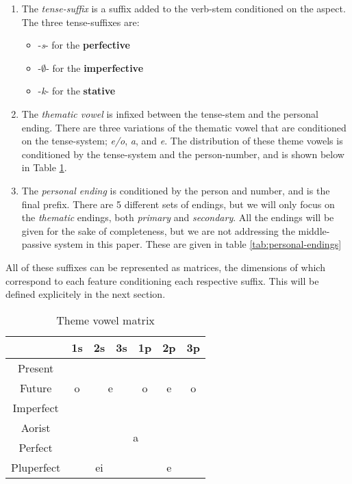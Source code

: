 \documentclass[12pt]{article}
\begin{document}
\begin{enumerate}
    \item The \textit{tense-suffix} is a suffix added to the verb-stem conditioned
        on the aspect. The three tense-suffixes are:
        \begin{itemize}
            \item -\textit{s}- for the \textbf{perfective}
            \item -$\emptyset$- for the \textbf{imperfective}
            \item -\textit{k}- for the \textbf{stative}
        \end{itemize}
    \item The \textit{thematic vowel} is infixed between the tense-stem and the
        personal ending. There are three variations of the thematic vowel 
        that are conditioned on the tense-system; \textit{e/o}, \textit{a}, and
        \textit{e}. The distribution of these theme vowels is conditioned by the
        tense-system and the person-number, and is shown below in Table \ref{tab:theme}.
    \item The \textit{personal ending} is conditioned by the person and number, and
        is the final prefix. There are 5 different sets of endings, but we will only
        focus on the \textit{thematic} endings, both \textit{primary} and
        \textit{secondary}. All the endings will be given for the sake of completeness,
        but we are not addressing the middle-passive system in this paper. These are given
        in table \ref{tab:personal-endings}
\end{enumerate}

All of these suffixes can be represented as matrices, the dimensions of which
correspond to each feature conditioning each respective suffix. This will be
defined explicitely in the next section.

\begin{table}
\centering
\begin{tabular}{|c|c|c|c|c|c|c|}
    \hline
    & \textbf{1s} & \textbf{2s} & \textbf{3s} & \textbf{1p} & \textbf{2p} & \textbf{3p}\\
    \hline
    Present     & \multirow{3}{*}{o} & \multicolumn{2}{c|}{\multirow{3}{*}{e}} & \multirow{3}{*}{o} & \multirow{3}{*}{e} & \multirow{3}{*}{o}\\
    Future      &                    & \multicolumn{2}{c|}{}   &                    &                    &                   \\
    Imperfect   &                    & \multicolumn{2}{c|}{}   &                    &                    &                   \\
    \hline
    Aorist      & \multicolumn{6}{c|}{\multirow{2}{*}{a}}\\
    Perfect     & \multicolumn{6}{c|}{}\\
    \hline
    Pluperfect  & \multicolumn{3}{c|}{ei} & \multicolumn{3}{c|}{e}\\ 
    \hline
\end{tabular}
\caption{Theme vowel matrix}
\label{tab:theme}
\end{table}
\end{document}
